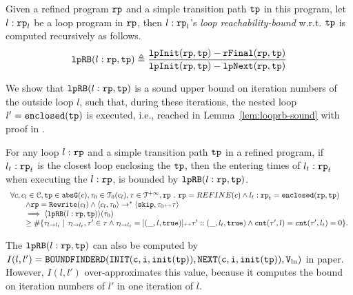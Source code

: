 %
\begin{defn}
  \label{def:looprb}
  Given a refined program $\mathtt{rp}$ and a simple transition path $\mathtt{tp}$ in this program, 
  let $l: \mathtt{rp}_l$ be a loop program in $\mathtt{rp}$,
  then $l: \mathtt{rp}_l$'s \emph{loop reachability-bound} w.r.t. $\mathtt{tp}$
  is computed recursively as follows. 
  \[
    \mathtt{lpRB}(l: \mathtt{rp}, \mathtt{tp}) \triangleq
    \frac{\mathtt{lpInit}(\mathtt{rp}, \mathtt{tp}) - \mathtt{rFinal}(\mathtt{rp}, \mathtt{tp})}{\mathtt{lpInit}(\mathtt{rp}, \mathtt{tp}) - \mathtt{lpNext}(\mathtt{rp}, \mathtt{tp})}
  \]
\end{defn}
%
We show that $\mathtt{lpRB}(l: \mathtt{rp}, \mathtt{tp})$
is a sound upper bound on iteration numbers of the outside loop $l$,
such that,
during these iterations, the nested loop $l' = \mathtt{enclosed(\mathtt{tp})}$ is executed, i.e., reached in Lemma~\ref{lem:looprb-sound} with proof in .
\begin{lem}
  \label{lem:looprb-sound}
  For any loop $l: \mathtt{rp}$ and a simple transition path $\mathtt{tp}$ in a refined program, if $l_t: \mathtt{rp}_t$ is the closest loop enclosing the $\mathtt{tp}$, then the entering times of $l_t: \mathtt{rp}_t$ when executing the $l: \mathtt{rp}$, is bounded by $\mathtt{lpRB}(l: \mathtt{rp}, \mathtt{tp})$.
  \[
    \begin{array}{l}
    \forall c, c_l \in \cdom, \tpath \in \absG(c), \trace_0 \in \tdom_0(c_l), \trace \in \inftdom, \rprog \st 
    \rprog = REFINE(c)
    \land
    l_t: \rprog_t = \kw{enclosed}(\rprog, \tpath)
    \\ \qquad
    \land 
    \rprog = \algrewrite(c_l)
    \land
    \config{c_l, \trace_0} \to^* 
    \config{\eskip, \trace_0 \tracecat \trace}
    \\ \qquad
    \implies
    \config{\lpchB(l: \rprog, \tpath)}(\trace_0) 
    \\ \qquad \geq 
    \# \left\{\trace_{l \to l_t} ~\vert~ \trace_{l \to l_t}, \trace' \in \trace \land \trace_{l \to l_t} = [(\_, l, \etrue)] \tracecat \trace' :: (\_, l_t, \etrue)
    \land \counter(\trace', l) = \counter(\trace', l_t) = 0 
    \right\}.
    \end{array}
  \]
\end{lem}
%
The $\mathtt{lpRB}(l:\mathtt{rp}, \mathtt{tp})$ 
can also be computed by
$I(l, l') = \mathtt{BOUNDFINDERD(INIT(c, i, \mathtt{init}(\mathtt{tp})), NEXT(c, i, \mathtt{init}(\mathtt{tp})), V_{\ln})}$ in paper\cite{GulwaniJK09}.
However, $I(l, l')$ over-approximates this value, because it computes the bound on iteration numbers of $l'$ in one iteration of $l$.
